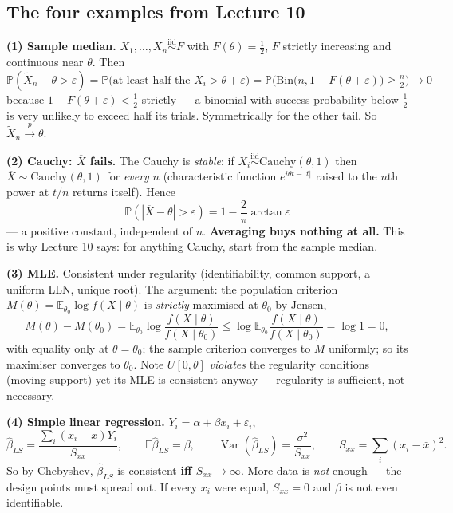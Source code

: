 \documentclass[11pt]{article}
\newcommand{\E}{\mathbb{E}}
\newcommand{\Var}{\operatorname{Var}}
\newcommand{\Prob}{\mathbb{P}}
\newcommand{\Xbar}{\overline{X}}
\newcommand{\iid}{\overset{\text{iid}}{\sim}}
\newcommand{\pto}{\overset{p}{\longrightarrow}}
\begin{document}
\subsection{The four examples from Lecture 10}

\textbf{(1) Sample median.} $X_1,\dots,X_n\iid F$ with $F(\theta)=\tfrac12$, $F$ strictly
increasing and continuous near $\theta$. Then
\[
\Prob(\tilde X_n-\theta>\varepsilon)
=\Prob\big(\text{at least half the }X_i>\theta+\varepsilon\big)
=\Prob\Big(\mathrm{Bin}\big(n,1-F(\theta+\varepsilon)\big)\ge\tfrac n2\Big)\to0
\]
because $1-F(\theta+\varepsilon)<\tfrac12$ strictly --- a binomial with success probability
below $\tfrac12$ is very unlikely to exceed half its trials. Symmetrically for the other
tail. So $\tilde X_n\pto\theta$.

\textbf{(2) Cauchy: $\Xbar$ fails.} The Cauchy is \emph{stable}: if
$X_i\iid\mathrm{Cauchy}(\theta,1)$ then $\Xbar\sim\mathrm{Cauchy}(\theta,1)$ for
\emph{every} $n$ (characteristic function $e^{i\theta t-|t|}$ raised to the $n$th power at
$t/n$ returns itself). Hence
\[
\Prob(|\Xbar-\theta|>\varepsilon)=1-\frac2\pi\arctan\varepsilon
\]
--- a positive constant, independent of $n$. \textbf{Averaging buys nothing at all.} This is
why Lecture 10 says: for anything Cauchy, start from the sample median.

\textbf{(3) MLE.} Consistent under regularity (identifiability, common support, a uniform LLN,
unique root). The argument: the population criterion
$M(\theta)=\E_{\theta_0}\log f(X\mid\theta)$ is \emph{strictly} maximised at $\theta_0$ by
Jensen,
\[
M(\theta)-M(\theta_0)=\E_{\theta_0}\log\frac{f(X\mid\theta)}{f(X\mid\theta_0)}
\le\log\E_{\theta_0}\frac{f(X\mid\theta)}{f(X\mid\theta_0)}=\log1=0 ,
\]
with equality only at $\theta=\theta_0$; the sample criterion converges to $M$ uniformly; so
its maximiser converges to $\theta_0$. Note $U[0,\theta]$ \emph{violates} the regularity
conditions (moving support) yet its MLE is consistent anyway --- regularity is sufficient, not
necessary.

\textbf{(4) Simple linear regression.} $Y_i=\alpha+\beta x_i+\varepsilon_i$,
\[
\hat\beta_{LS}=\frac{\sum_i(x_i-\bar x)Y_i}{S_{xx}},\qquad
\E\hat\beta_{LS}=\beta,\qquad
\Var(\hat\beta_{LS})=\frac{\sigma^2}{S_{xx}},\qquad S_{xx}=\sum_i(x_i-\bar x)^2 .
\]
So by Chebyshev, $\hat\beta_{LS}$ is consistent \textbf{iff $S_{xx}\to\infty$}. More data is
\emph{not} enough --- the design points must spread out. If every $x_i$ were equal, $S_{xx}=0$
and $\beta$ is not even identifiable.
\end{document}
